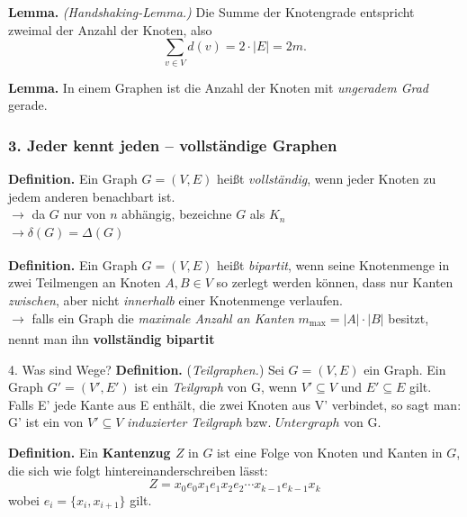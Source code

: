 \documentclass{beamer}
\begin{document}
\begin{frame}
    \textbf{Lemma.} \textit{(Handshaking-Lemma.)}
    Die Summe der Knotengrade entspricht zweimal der Anzahl der Knoten, also
    \[\sum_{v \in V}d(v) = 2 \cdot |E| = 2m.\]
\end{frame}

\begin{frame}
    \textbf{Lemma.}
    In einem Graphen ist die Anzahl der Knoten mit \textit{ungeradem Grad} gerade.
\end{frame}

\begin{frame}
    \frametitle{3. Jeder kennt jeden -- vollständige Graphen}
    \textbf{Definition.}
    Ein Graph \(G = (V, E)\) heißt \textit{vollständig}, wenn jeder Knoten zu jedem anderen benachbart ist.\\
    \bigskip
    \(\xrightarrow[]{}\) da \(G\) nur von \(n\) abhängig, bezeichne \(G\) als \(K_n\)\\
    \(\xrightarrow[]{} \delta(G) = \Delta(G)\) 
\end{frame}

\begin{frame}
    \textbf{Definition.} Ein Graph \(G = (V, E)\) heißt \textit{bipartit}, wenn seine Knotenmenge in zwei Teilmengen an Knoten \(A, B \in V\) so zerlegt werden können, dass nur Kanten \textit{zwischen}, aber nicht \textit{innerhalb} einer Knotenmenge verlaufen.\\ 
    \bigskip
    \(\xrightarrow[]{}\) falls ein Graph die \textit{maximale Anzahl an Kanten} \(m_{\text{max}} = |A| \cdot |B|\) besitzt, nennt man ihn \textbf{vollständig bipartit}
\end{frame}

\begin{frame}{4. Was sind Wege?}
    \textbf{Definition.} (\textit{Teilgraphen.}) Sei \(G = (V, E)\) ein Graph. Ein Graph \(G' = (V', E')\) ist ein \textit{Teilgraph} von G, wenn \(V' \subseteq V\) und \(E' \subseteq E\) gilt.\\
    Falls E' jede Kante aus E enthält, die zwei Knoten aus V' verbindet, so sagt man: G' ist ein von \(V' \subseteq V\) \textit{induzierter Teilgraph} bzw. \(Untergraph\) von G.
\end{frame}

\begin{frame}
    \textbf{Definition.} Ein \textbf{Kantenzug \(Z\)} in \(G\) ist eine Folge von Knoten und Kanten in \(G\), die sich wie folgt hintereinanderschreiben lässt:
    \[Z = x_0e_0x_1e_1x_2e_2\cdots x_{k-1}e_{k-1}x_k\]   
    wobei \(e_i = \{x_i, x_{i+1}\}\) gilt.\\
    \bigskip
\end{frame}
\end{document}

